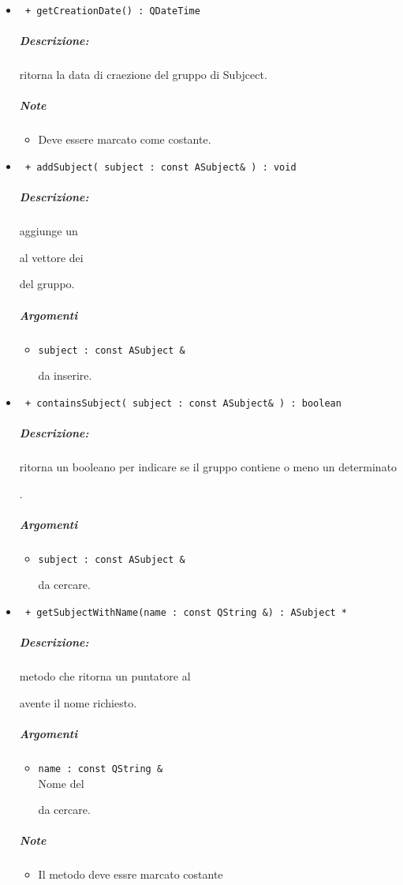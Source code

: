 \begin{itemize}
		\item 	\color{blue}\verb! + getCreationDate() : QDateTime !\\
		\color{black}
		\subparagraph{Descrizione:} ritorna la data di craezione del gruppo di Subjcect.
		\subparagraph{Note}
			\begin{itemize}
				\item Deve essere marcato come costante.
			\end{itemize}
		
		\item \color{blue}\verb! + addSubject( subject : const ASubject& ) : void !\\
		\color{black}
		\subparagraph{Descrizione:} aggiunge un \subject{} al vettore dei \subject{} del gruppo.
		\subparagraph{Argomenti}
				\begin{itemize}
					\item \color{RoyalPurple}\verb!subject : const ASubject &! \\ 
					\color{black}\subject{} da inserire.
				\end{itemize}
		
		\item 	\color{blue}\verb! + containsSubject( subject : const ASubject& ) : boolean !\\
			\color{black} 
			\subparagraph{Descrizione:} ritorna un booleano per indicare se il gruppo contiene o meno un determinato \subject{}.
			\subparagraph{Argomenti}
				\begin{itemize}
					\item \color{RoyalPurple}\verb!subject : const ASubject &! \\
					\color{black} \subject{} da cercare.
				\end{itemize}
			
		\item 	\color{blue}\verb! + getSubjectWithName(name : const QString &) : ASubject * !
		\color{black}
		\subparagraph{Descrizione:} metodo  che ritorna un puntatore al \subject{} avente il nome richiesto.
		\subparagraph{Argomenti}
			\begin{itemize}
				\item \color{RoyalPurple}\verb!name : const QString &! \\ 
				\color{black}Nome del \subject{} da cercare.
			\end{itemize}	
		\subparagraph{Note}
			\begin{itemize}
				\item Il metodo deve essre marcato costante
			\end{itemize}
			

\end{itemize}
